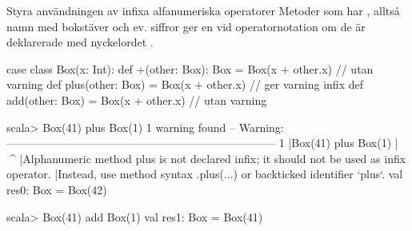 \begin{Slide}{Styra användningen av infixa alfanumeriska operatorer}\SlideFontSmall
Metoder som har , alltså namn med bokstäver och ev. siffror ger en  vid operatornotation om de  är deklarerade med nyckelordet .   
\pause
\begin{Code}
case class Box(x: Int):
  def +(other: Box): Box = Box(x + other.x)    // utan varning
  def plus(other: Box) = Box(x + other.x)      // ger varning
  infix def add(other: Box) = Box(x + other.x) // utan varning
\end{Code}
\begin{REPLsmall}
scala> Box(41) plus Box(1)
1 warning found
-- Warning: ------------------------------------------------------------------------
1 |Box(41) plus Box(1)
  |        ^^^^
  |Alphanumeric method plus is not declared infix; it should not be used as infix operator.
  |Instead, use method syntax .plus(...) or backticked identifier `plus`.
val res0: Box = Box(42)

scala> Box(41) add Box(1)
val res1: Box = Box(41)
\end{REPLsmall}
\end{Slide}







